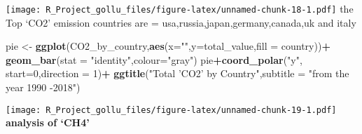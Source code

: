 \documentclass[
]{article}
\newenvironment{Shaded}{\begin{snugshade}}{\end{snugshade}}
\newcommand{\DataTypeTok}[1]{\textcolor[rgb]{0.13,0.29,0.53}{#1}}
\newcommand{\DecValTok}[1]{\textcolor[rgb]{0.00,0.00,0.81}{#1}}
\newcommand{\KeywordTok}[1]{\textcolor[rgb]{0.13,0.29,0.53}{\textbf{#1}}}
\newcommand{\NormalTok}[1]{#1}
\newcommand{\OperatorTok}[1]{\textcolor[rgb]{0.81,0.36,0.00}{\textbf{#1}}}
\newcommand{\StringTok}[1]{\textcolor[rgb]{0.31,0.60,0.02}{#1}}
\begin{document}
\texttt{[image: R\_Project\_gollu\_files/figure-latex/unnamed-chunk-18-1.pdf]}
the Top `CO2' emission countries are =
usa,russia,japan,germany,canada,uk and italy

\begin{Shaded}
\begin{Highlighting}[]
\NormalTok{pie <-}\StringTok{ }\KeywordTok{ggplot}\NormalTok{(CO2_by_country,}\KeywordTok{aes}\NormalTok{(}\DataTypeTok{x=}\StringTok{""}\NormalTok{,}\DataTypeTok{y=}\NormalTok{total_value,}\DataTypeTok{fill =}\NormalTok{ country))}\OperatorTok{+}
\StringTok{  }\KeywordTok{geom_bar}\NormalTok{(}\DataTypeTok{stat =} \StringTok{"identity"}\NormalTok{,}\DataTypeTok{colour=}\StringTok{"gray"}\NormalTok{)}
\NormalTok{pie}\OperatorTok{+}\KeywordTok{coord_polar}\NormalTok{(}\StringTok{"y"}\NormalTok{, }\DataTypeTok{start=}\DecValTok{0}\NormalTok{,}\DataTypeTok{direction =} \DecValTok{1}\NormalTok{)}\OperatorTok{+}
\StringTok{  }\KeywordTok{ggtitle}\NormalTok{(}\StringTok{"Total 'CO2' by Country"}\NormalTok{,}\DataTypeTok{subtitle =} \StringTok{"from the year 1990 -2018"}\NormalTok{)}
\end{Highlighting}
\end{Shaded}

\texttt{[image: R\_Project\_gollu\_files/figure-latex/unnamed-chunk-19-1.pdf]}
\textbf{analysis of `CH4'}
\end{document}
